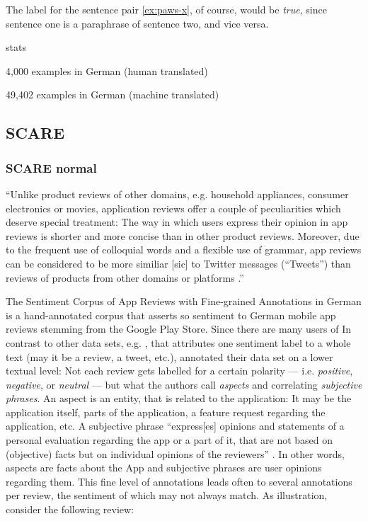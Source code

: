 The label for the sentence pair \ref{ex:paws-x}, of course, would be \emph{true}, since sentence one is a paraphrase of sentence two, and vice versa.


stats

4,000 examples in German (human translated)

49,402 examples in German (machine translated)



\subsection{SCARE}

\subsubsection{SCARE normal}

``Unlike product reviews of other domains, e.g. household appliances, consumer electronics or movies, application reviews offer a couple of peculiarities which deserve special treatment:
The way in which users express their opinion in app reviews is shorter and more concise than in other product reviews.
Moreover, due to the frequent use of colloquial words and a flexible use of grammar, app reviews can be considered to be more similiar [sic] to Twitter messages (“Tweets”) than reviews of products from other domains or platforms \textelp{}.'' \citep[p.~1114]{sanger2016scare}


The Sentiment Corpus of App Reviews with Fine-grained Annotations in German \cite{sanger2016scare} is a hand-annotated corpus that asserts so sentiment to German mobile app reviews stemming from the Google Play Store.
Since there are many users of 
In contrast to other data sets, e.g. \citep{socher2013recursive, go2009twitter}, that attributes one sentiment label to a whole text (may it be a review, a tweet, etc.), \cite{sanger2016scare} annotated their data set on a lower textual level:
Not each review gets labelled for a certain polarity --- i.e. \emph{positive}, \emph{negative}, or \emph{neutral} --- but what the authors call \emph{aspects} and correlating \emph{subjective phrases}.
An aspect is an entity, that is related to the application:
It may be the application itself, parts of the application, a feature request regarding the application, etc.
A subjective phrase ``express[es] opinions and statements of a personal evaluation regarding the app or a part of it, that are not based on (objective) facts but on individual opinions of the reviewers'' \citep[p.~1116]{sanger2016scare}.
In other words, aspects are facts about the App and subjective phrases are user opinions regarding them.
This fine level of annotations leads often to several annotations per review, the sentiment of which may not always match.
As illustration, consider the following review:


